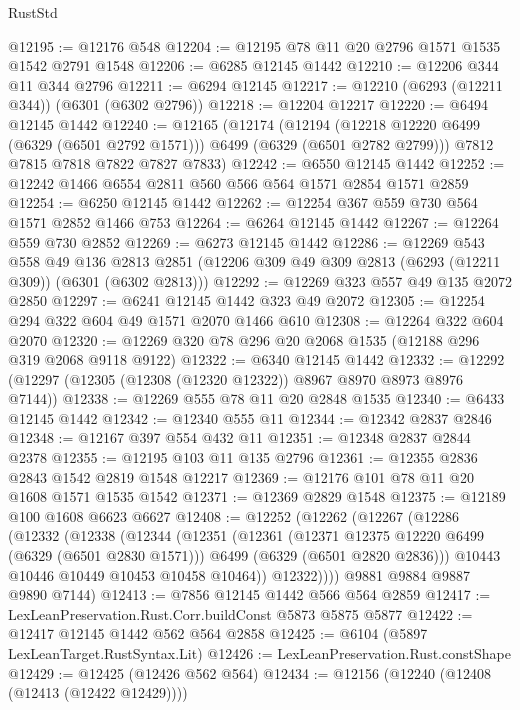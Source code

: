 \begin{lexlean}{RustStd}
\begin{coremodule}
{\begin{coremodule}
{{{{{{{{{{{{{{{{{{{{{{{{{{{{{{{{{{{@12195 := @12176 @548
@12204 := @12195 @78 @11 @20 @2796 @1571 @1535 @1542 @2791 @1548
@12206 := @6285 @12145 @1442
@12210 := @12206 @344 @11 @344 @2796
@12211 := @6294 @12145
@12217 := @12210 (@6293 (@12211 @344)) (@6301 (@6302 @2796))
@12218 := @12204 @12217
@12220 := @6494 @12145 @1442
@12240 := @12165
    (@12174
      (@12194 (@12218 @12220 @6499 (@6329 (@6501 @2792 @1571))) @6499 (@6329 (@6501 @2782 @2799)))
      @7812
      @7815
      @7818
      @7822
      @7827
      @7833)
@12242 := @6550 @12145 @1442
@12252 := @12242 @1466 @6554 @2811 @560 @566 @564 @1571 @2854 @1571 @2859
@12254 := @6250 @12145 @1442
@12262 := @12254 @367 @559 @730 @564 @1571 @2852 @1466 @753
@12264 := @6264 @12145 @1442
@12267 := @12264 @559 @730 @2852
@12269 := @6273 @12145 @1442
@12286 := @12269
    @543
    @558
    @49
    @136
    @2813
    @2851
    (@12206 @309 @49 @309 @2813 (@6293 (@12211 @309)) (@6301 (@6302 @2813)))
@12292 := @12269 @323 @557 @49 @135 @2072 @2850
@12297 := @6241 @12145 @1442 @323 @49 @2072
@12305 := @12254 @294 @322 @604 @49 @1571 @2070 @1466 @610
@12308 := @12264 @322 @604 @2070
@12320 := @12269 @320 @78 @296 @20 @2068 @1535 (@12188 @296 @319 @2068 @9118 @9122)
@12322 := @6340 @12145 @1442
@12332 := @12292 (@12297 (@12305 (@12308 (@12320 @12322)) @8967 @8970 @8973 @8976 @7144))
@12338 := @12269 @555 @78 @11 @20 @2848 @1535
@12340 := @6433 @12145 @1442
@12342 := @12340 @555 @11
@12344 := @12342 @2837 @2846
@12348 := @12167 @397 @554 @432 @11
@12351 := @12348 @2837 @2844 @2378
@12355 := @12195 @103 @11 @135 @2796
@12361 := @12355 @2836 @2843 @1542 @2819 @1548 @12217
@12369 := @12176 @101 @78 @11 @20 @1608 @1571 @1535 @1542
@12371 := @12369 @2829 @1548
@12375 := @12189 @100 @1608 @6623 @6627
@12408 := @12252
    (@12262
      (@12267
        (@12286
          (@12332
            (@12338
              (@12344
                (@12351
                  (@12361
                    (@12371 @12375 @12220 @6499 (@6329 (@6501 @2830 @1571)))
                    @6499
                    (@6329 (@6501 @2820 @2836)))
                  @10443
                  @10446
                  @10449
                  @10453
                  @10458
                  @10464))
              @12322))))
      @9881
      @9884
      @9887
      @9890
      @7144)
@12413 := @7856 @12145 @1442 @566 @564 @2859
@12417 := LexLeanPreservation.Rust.Corr.buildConst @5873 @5875 @5877
@12422 := @12417 @12145 @1442 @562 @564 @2858
@12425 := @6104 (@5897 LexLeanTarget.RustSyntax.Lit)
@12426 := LexLeanPreservation.Rust.constShape
@12429 := @12425 (@12426 @562 @564)
@12434 := @12156 (@12240 (@12408 (@12413 (@12422 @12429))))
}}}}}}}}}}}}}}}}}}}}}}}}}}}}}}}}}}}
\end{coremodule}}
\end{coremodule}
\end{lexlean}
